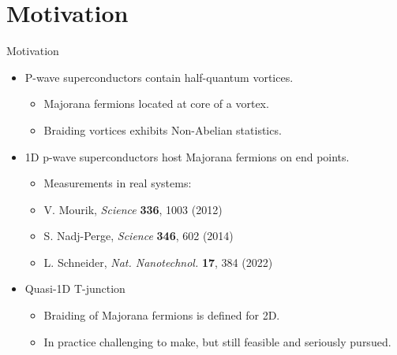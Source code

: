 \documentclass[xcolor=dvipsnames,10pt,aspectratio=169]{beamer}
\newcommand{\MO}{Motivation}
\begin{document}
  \section{\MO}
  \begin{frame}{\MO}{}

    \begin{multicols}{2}

    \begin{itemize}
      \item P-wave superconductors contain half-quantum vortices.
        \begin{itemize}
          \item Majorana fermions located at core of a vortex.
          \item Braiding vortices exhibits Non-Abelian statistics.
        \end{itemize}
      \item 1D p-wave superconductors host Majorana fermions on end points.
        \begin{itemize}
          \item Measurements in real systems:
          \item[] \hspace{0.40em}\scriptsize V. Mourik, \textit{Science} \textbf{336}, 1003 (2012)
          \item[] \hspace{0.50em}\scriptsize S. Nadj-Perge, \textit{Science} \textbf{346}, 602 (2014)
          \item[] \hspace{0.50em}\scriptsize L. Schneider, \textit{Nat. Nanotechnol.} \textbf{17}, 384 (2022)
        \end{itemize}
      \item Quasi-1D T-junction
        \begin{itemize}
          \item Braiding of Majorana fermions is defined for 2D.
          \item In practice challenging to make, but still feasible and seriously pursued.
        \end{itemize}
    \end{itemize}


\end{multicols}
\end{frame}
\end{document}
